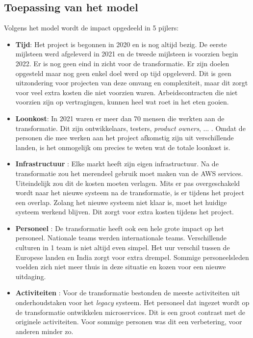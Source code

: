 \subsection{Toepassing van het model}

Volgens het model wordt de impact opgedeeld in 5 pijlers:

\begin{itemize}
    \item \textbf{Tijd}: Het project is begonnen in 2020 en is nog altijd bezig. De eerste mijlsteen werd afgeleverd in 2021 en de tweede mijlsteen is voorzien begin 2022. Er is nog geen eind in zicht voor de transformatie. Er zijn doelen opgesteld maar nog geen enkel doel werd op tijd opgeleverd. Dit is geen uitzondering voor projecten van deze omvang en complexiteit, maar dit zorgt voor veel extra kosten die niet voorzien waren. Arbeidscontracten die niet voorzien zijn op vertragingen, kunnen heel wat roet in het eten gooien. 
    \item \textbf{Loonkost}: In 2021 waren er meer dan 70 mensen die werkten aan de transformatie. Dit zijn ontwikkelaars, testers, \emph{product owners}, ... . Omdat de personen die mee werken aan het project afkomstig zijn uit verschillende landen, is het onmogelijk om precies te weten wat de totale loonkost is. 
    \item \textbf{Infrastructuur} : Elke markt heeft zijn eigen infrastructuur. Na de transformatie zou het merendeel gebruik moet maken van de AWS services. Uiteindelijk zou dit de kosten moeten verlagen. Mits er pas overgeschakeld wordt naar het nieuwe systeem na de transformatie, is er tijdens het project een overlap. Zolang het nieuwe systeem niet klaar is, moet het huidige systeem werkend blijven. Dit zorgt voor extra kosten tijdens het project.
    \item \textbf{Personeel} : De transformatie heeft ook een hele grote impact op het personeel. Nationale teams werden internationale teams. Verschillende culturen in 1 team is niet altijd even simpel. Het uur verschil tussen de Europese landen en India zorgt voor extra drempel. Sommige personeelsleden voelden zich niet meer thuis in deze situatie en kozen voor een nieuwe uitdaging. 
    \item \textbf{Activiteiten} : Voor de transformatie bestonden de meeste activiteiten uit onderhoudstaken voor het \emph{legacy} systeem. Het personeel dat ingezet wordt op de transformatie ontwikkelen microservices. Dit is een groot contrast met de originele activiteiten. Voor sommige personen was dit een verbetering, voor anderen minder zo.
    
\end{itemize}


